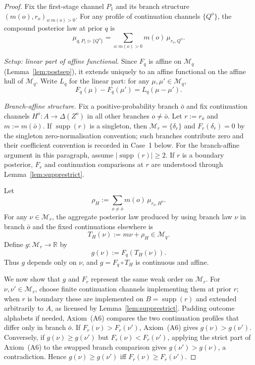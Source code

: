 \documentclass[11pt,a4paper]{article}
\theoremstyle{definition}
\newcommand{\R}{\mathbb R}
\newcommand{\1}{\mathbf 1}
\begin{document}
\begin{proof}
Fix the first-stage channel $P_1$ and its branch structure $(m(o),r_o)_{o:m(o)>0}$.  For any profile of continuation
channels $\{Q^o\}$, the compound posterior law at prior $q$ is
\[
\mu_{q,P_1\triangleright\{Q^o\}}
=
\sum_{o:m(o)>0}m(o)\,\mu_{r_o,Q^o}.
\]

\emph{Setup: linear part of affine functional.}  Since $F_q$ is affine on $\mathcal M_q$ (Lemma~\ref{lem:postsep}),
it extends uniquely to an affine functional on the affine hull of $\mathcal M_q$.  Write $L_q$ for the linear part:
for any $\mu,\mu'\in\mathcal M_q$,
\[
F_q(\mu)-F_q(\mu')=L_q(\mu-\mu').
\]

\emph{Branch-affine structure.}  Fix a positive-probability branch $\bar o$ and fix continuation channels
$H^o:A\to\Delta(Z^o)$ in all other branches $o\ne\bar o$.  Let $r:=r_{\bar o}$ and $m:=m(\bar o)$.  If
$\operatorname{supp}(r)$ is a singleton, then $\mathcal M_r=\{\delta_r\}$ and $F_r(\delta_r)=0$ by the singleton
zero-normalisation convention; such branches contribute zero and their coefficient convention is recorded in
Case~1 below.  For the branch-affine argument in this paragraph, assume $|\operatorname{supp}(r)|\ge2$.  If $r$ is a
boundary posterior, $F_r$ and continuation comparisons at $r$ are understood through Lemma~\ref{lem:supprestrict}.

Let
\[
\rho_H:=\sum_{o\ne\bar o}m(o)\,\mu_{r_o,H^o}.
\]
For any $\nu\in\mathcal M_r$, the aggregate posterior law produced by using branch law $\nu$ in branch $\bar o$ and
the fixed continuations elsewhere is
\[
T_H(\nu):=m\nu+\rho_H\in\mathcal M_q.
\]
Define $g:\mathcal M_r\to\R$ by
\[
g(\nu):=F_q(T_H(\nu)).
\]
Thus $g$ depends only on $\nu$, and $g=F_q\circ T_H$ is continuous and affine.

We now show that $g$ and $F_r$ represent the same weak order on $\mathcal M_r$.  For $\nu,\nu'\in\mathcal M_r$, choose
finite continuation channels implementing them at prior $r$; when $r$ is boundary these are implemented on
$B=\operatorname{supp}(r)$ and extended arbitrarily to $A$, as licensed by Lemma~\ref{lem:supprestrict}.  Padding outcome
alphabets if needed, Axiom~\textup{(A6)} compares the two continuation profiles that differ only in branch $\bar o$.
If $F_r(\nu)>F_r(\nu')$, Axiom~\textup{(A6)} gives $g(\nu)>g(\nu')$.  Conversely, if $g(\nu)\ge g(\nu')$ but
$F_r(\nu)<F_r(\nu')$, applying the strict part of Axiom~\textup{(A6)} to the swapped branch comparison gives
$g(\nu')>g(\nu)$, a contradiction.  Hence $g(\nu)\ge g(\nu')$ iff $F_r(\nu)\ge F_r(\nu')$.


\end{proof}
\end{document}
